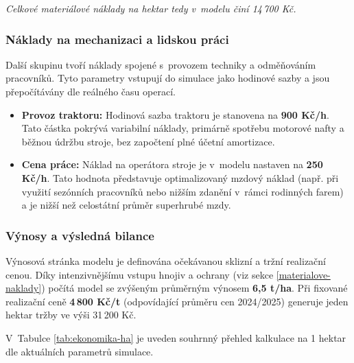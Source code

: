 \documentclass[11pt,a4paper]{article}
\begin{document}
\noindent \textit{Celkové materiálové náklady na hektar tedy v~modelu činí 14\,700 Kč.}

\subsubsection{Náklady na mechanizaci a lidskou práci}

Další skupinu tvoří náklady spojené s~provozem techniky a odměňováním pracovníků. Tyto parametry vstupují do simulace jako hodinové sazby a jsou přepočítávány dle reálného času operací.

\begin{itemize}
    \item \textbf{Provoz traktoru:} Hodinová sazba traktoru je stanovena na \textbf{900 Kč/h}. Tato částka pokrývá variabilní náklady, primárně spotřebu motorové nafty a běžnou údržbu stroje, bez započtení plné účetní amortizace\cite{mechanizace-zemědělství-kalkulace}.
    
    \item \textbf{Cena práce:} Náklad na operátora stroje je v~modelu nastaven na \textbf{250 Kč/h}. Tato hodnota představuje optimalizovaný mzdový náklad (např. při využití sezónních pracovníků nebo nižším zdanění v~rámci rodinných farem) a je nižší než celostátní průměr superhrubé mzdy\cite{platy-cz-traktorista}.
\end{itemize}

\subsubsection{Výnosy a výsledná bilance}

Výnosová stránka modelu je definována očekávanou sklizní a tržní realizační cenou. Díky intenzivnějšímu vstupu hnojiv a ochrany (viz sekce \ref{materialove-naklady}) počítá model se zvýšeným průměrným výnosem \textbf{6,5 t/ha}. Při fixované realizační ceně \textbf{4\,800 Kč/t} (odpovídající průměru cen 2024/2025) generuje jeden hektar tržby ve výši 31\,200 Kč\cite{szif-komoditni-zprava}.

V~Tabulce \ref{tab:ekonomika-ha} je uveden souhrnný přehled kalkulace na 1 hektar dle aktuálních parametrů simulace.
\end{document}
